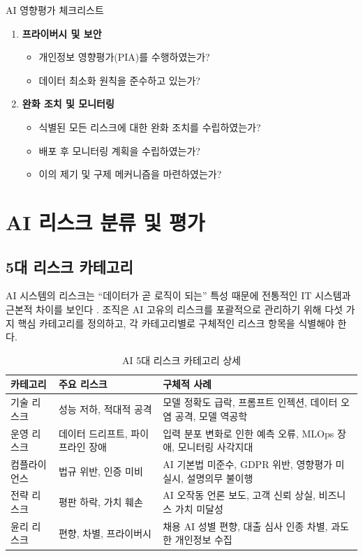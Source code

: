 \begin{practicaltool}{AI 영향평가 체크리스트}
\begin{enumerate}
 \item \textbf{프라이버시 및 보안}
 \begin{itemize}
  \item[$\square$] 개인정보 영향평가(PIA)를 수행하였는가?
  \item[$\square$] 데이터 최소화 원칙을 준수하고 있는가?
 \end{itemize}

 \item \textbf{완화 조치 및 모니터링}
 \begin{itemize}
  \item[$\square$] 식별된 모든 리스크에 대한 완화 조치를 수립하였는가?
  \item[$\square$] 배포 후 모니터링 계획을 수립하였는가?
  \item[$\square$] 이의 제기 및 구제 메커니즘을 마련하였는가?
 \end{itemize}
\end{enumerate}
\end{practicaltool}

\section{AI 리스크 분류 및 평가}
\label{sec:5.3}

\subsection{5대 리스크 카테고리}
\label{sec:5.3.1}

AI 시스템의 리스크는 ``데이터가 곧 로직이 되는'' 특성 때문에 전통적인 IT 시스템과 근본적 차이를 보인다 \cite{nist2023airmf}. 조직은 AI 고유의 리스크를 포괄적으로 관리하기 위해 다섯 가지 핵심 카테고리를 정의하고, 각 카테고리별로 구체적인 리스크 항목을 식별해야 한다.

\begin{table}[htbp]
\centering
\caption{AI 5대 리스크 카테고리 상세}
\label{tab:risk_categories_detail}
\begin{tabularx}{\textwidth}{p{2cm}p{3.5cm}X}
\toprule
\textbf{카테고리} & \textbf{주요 리스크} & \textbf{구체적 사례} \\
\midrule
기술 리스크 & 성능 저하, 적대적 공격 & 모델 정확도 급락, 프롬프트 인젝션, 데이터 오염 공격, 모델 역공학 \\
\midrule
운영 리스크 & 데이터 드리프트, 파이프라인 장애 & 입력 분포 변화로 인한 예측 오류, MLOps 장애, 모니터링 사각지대 \\
\midrule
컴플라이언스 & 법규 위반, 인증 미비 & AI 기본법 미준수, GDPR 위반, 영향평가 미실시, 설명의무 불이행 \\
\midrule
전략 리스크 & 평판 하락, 가치 훼손 & AI 오작동 언론 보도, 고객 신뢰 상실, 비즈니스 가치 미달성 \\
\midrule
윤리 리스크 & 편향, 차별, 프라이버시 & 채용 AI 성별 편향, 대출 심사 인종 차별, 과도한 개인정보 수집 \\
\bottomrule
\end{tabularx}
\end{table}

